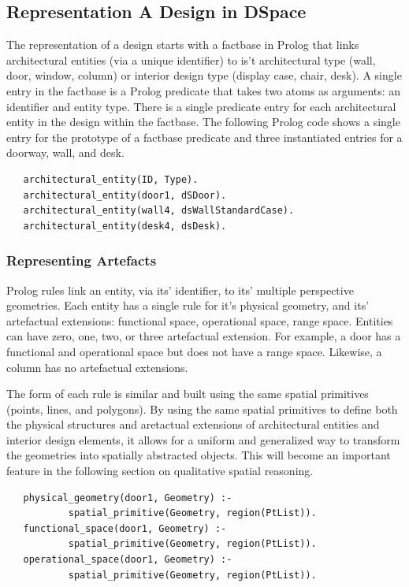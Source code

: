 \documentclass[12pt]{ucthesis}
\begin{document}
\subsection{Representation A Design in DSpace}
The representation of a design starts with a factbase in Prolog that links architectural entities (via a unique identifier) to is't architectural type (wall, door, window, column) or interior design type (display case, chair, desk). A single entry in the factbase is a Prolog predicate that takes two atoms as arguments: an identifier and entity type. There is a single predicate entry for each architectural entity in the design within the factbase. The following Prolog code shows a single entry for the prototype of a factbase predicate and three instantiated entries for a doorway, wall, and desk. 

\begin{verbatim}
   architectural_entity(ID, Type).
   architectural_entity(door1, dSDoor).
   architectural_entity(wall4, dsWallStandardCase).
   architectural_entity(desk4, dsDesk).
\end{verbatim}

\subsubsection{Representing Artefacts}
Prolog rules link an entity, via its' identifier, to its' multiple perspective geometries. Each entity has a single rule for it's physical geometry, and its' artefactual extensions: functional space, operational space, range space. Entities can have zero, one, two, or three artefactual extension. For example, a door has a functional and operational space but does not have a range space. Likewise, a column has no artefactual extensions. 

The form of each rule is similar and built using the same spatial primitives (points, lines, and polygons). By using the same spatial primitives to define both the physical structures and aretactual extensions of architectural entities and interior design elements, it allows for a uniform and generalized way to transform the geometries into spatially abstracted objects. This will become an important feature in the following section on qualitative spatial reasoning.   

\begin{verbatim}
   physical_geometry(door1, Geometry) :-
           spatial_primitive(Geometry, region(PtList)).
   functional_space(door1, Geometry) :-
           spatial_primitive(Geometry, region(PtList)).
   operational_space(door1, Geometry) :-
           spatial_primitive(Geometry, region(PtList)).
\end{verbatim}
\end{document}
